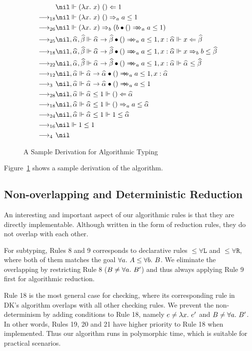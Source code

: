 \begin{figure}
\begin{gather*}
\begin{aligned}
           & \nil \Vdash (\lam x)~() \Lto 1\\
\rrule{18} & \nil \Vdash (\lam x)~() \To_a a\le 1\\
\rrule{26} & \nil \Vdash (\lam x) \To_b (\appInfAlg{b}{()}[a][a\le 1])\\
\rrule{25} & \nil,\al,\bt \Vdash \appInfAlg{\al\to\bt}{()}[a][a\le 1], x:\al \Vdash x\Lto \bt\\
\rrule{18} & \nil,\al,\bt \Vdash \appInfAlg{\al\to\bt}{()}[a][a\le 1], x:\al \Vdash x\To_b b\le \bt\\
\rrule{22} & \nil,\al,\bt \Vdash \appInfAlg{\al\to\bt}{()}[a][a\le 1], x:\al \Vdash \al\le \bt\\
\rrule{12} & \nil,\al \Vdash \appInfAlg{\al\to\al}{()}[a][a\le 1], x:\al\\
\rrule{3}  & \nil,\al \Vdash \appInfAlg{\al\to\al}{()}[a][a\le 1]\\
\rrule{28} & \nil,\al \Vdash \al\le 1 \Vdash () \Lto \al\\
\rrule{18} & \nil,\al \Vdash \al\le 1 \Vdash () \To_a a\le \al\\
\rrule{24} & \nil,\al \Vdash \al\le 1 \Vdash 1\le \al\\
\rrule{16} & \nil \Vdash 1\le 1\\
\rrule{4}  & \nil
\end{aligned}
\end{gather*}
\caption{A Sample Derivation for Algorithmic Typing}
\label{fig:alg:sample}
\end{figure}

Figure~\ref{fig:alg:sample} shows a sample derivation of the
algorithm.

\subsection{Non-overlapping and Deterministic Reduction}
An interesting and important aspect of our algorithmic rules is that
they are directly implementable.
Although written in the form of reduction rules, they do not overlap with each other.

For subtyping, Rules 8 and 9 corresponds to declarative rules
$\mathtt{{\le}\forall L}$ and $\mathtt{{\le}\forall R}$,
where both of them matches the goal $\all A\le \all[b]B$.
We eliminate the overlapping by restricting Rule 8 ($B\neq\all B'$)
and thus always applying Rule 9 first for algorithmic reduction.

Rule 18 is the most general case for checking,
where its corresponding rule in DK's algorithm overlaps with all other checking rules.
We prevent the non-determinism by adding conditions to Rule 18,
namely $e\neq\lam e'$ and $B\neq\all B'$.
In other words, Rules 19, 20 and 21 have higher priority to Rule 18 when implemented.
Thus our algorithm runs in polymorphic time, which is suitable for practical scenarios.



